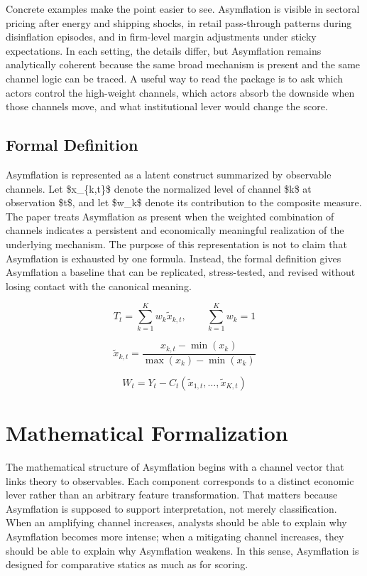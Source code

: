 \documentclass[12pt]{article}
\begin{document}
Concrete examples make the point easier to see. Asymflation is visible in sectoral pricing after energy and shipping shocks, in retail pass-through patterns during disinflation episodes, and in firm-level margin adjustments under sticky expectations. In each setting, the details differ, but Asymflation remains analytically coherent because the same broad mechanism is present and the same channel logic can be traced. A useful way to read the package is to ask which actors control the high-weight channels, which actors absorb the downside when those channels move, and what institutional lever would change the score.

\subsection{Formal Definition}
Asymflation is represented as a latent construct summarized by observable channels. Let \$x\_\{k,t\}\$ denote the normalized level of channel \$k\$ at observation \$t\$, and let \$w\_k\$ denote its contribution to the composite measure. The paper treats Asymflation as present when the weighted combination of channels indicates a persistent and economically meaningful realization of the underlying mechanism. The purpose of this representation is not to claim that Asymflation is exhausted by one formula. Instead, the formal definition gives Asymflation a baseline that can be replicated, stress-tested, and revised without losing contact with the canonical meaning.

\begin{equation}
T_t = \sum_{k=1}^K w_k \tilde{x}_{k,t}, \qquad \sum_{k=1}^K w_k = 1
\label{eq:index}
\end{equation}

\begin{equation}
\tilde{x}_{k,t} = \frac{x_{k,t} - \min(x_k)}{\max(x_k) - \min(x_k)}
\label{eq:norm}
\end{equation}

\begin{equation}
W_t = Y_t - C_t(\tilde{x}_{1,t}, \dots, \tilde{x}_{K,t})
\label{eq:welfare}
\end{equation}

\section{Mathematical Formalization}
The mathematical structure of Asymflation begins with a channel vector that links theory to observables. Each component corresponds to a distinct economic lever rather than an arbitrary feature transformation. That matters because Asymflation is supposed to support interpretation, not merely classification. When an amplifying channel increases, analysts should be able to explain why Asymflation becomes more intense; when a mitigating channel increases, they should be able to explain why Asymflation weakens. In this sense, Asymflation is designed for comparative statics as much as for scoring.
\end{document}
